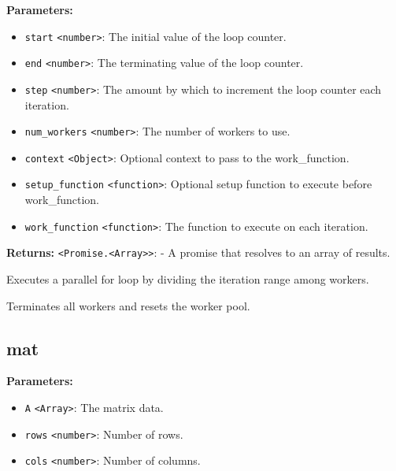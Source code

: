\documentclass[12pt,a4paper]{article}
\begin{document}
\noindent \textbf{Parameters:}
\begin{itemize}
  \item \texttt{start} \texttt{<number>}: The initial value of the loop counter.
  \item \texttt{end} \texttt{<number>}: The terminating value of the loop counter.
  \item \texttt{step} \texttt{<number>}: The amount by which to increment the loop counter each iteration.
  \item \texttt{num\_workers} \texttt{<number>}: The number of workers to use.
  \item \texttt{context} \texttt{<Object>}: Optional context to pass to the work\_function.
  \item \texttt{setup\_function} \texttt{<function>}: Optional setup function to execute before work\_function.
  \item \texttt{work\_function} \texttt{<function>}: The function to execute on each iteration.
\end{itemize}

\noindent \textbf{Returns:} \texttt{<Promise.<Array>>}: - A promise that resolves to an array of results.

\noindent Executes a parallel for loop by dividing the iteration range among workers.

\vspace{5mm}
\noindent {}


\noindent Terminates all workers and resets the worker pool.


\subsection{mat}
\vspace{5mm}
\noindent {}


\noindent \textbf{Parameters:}
\begin{itemize}
  \item \texttt{A} \texttt{<Array>}: The matrix data.
  \item \texttt{rows} \texttt{<number>}: Number of rows.
  \item \texttt{cols} \texttt{<number>}: Number of columns.
\end{itemize}
\end{document}

